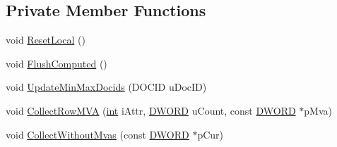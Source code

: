 \subsection*{Private Member Functions}
\begin{DoxyCompactItemize}
\item 
void \hyperlink{classAttrIndexBuilder__t_a227f1dbb6d0fb1033b981ae5cb452170}{Reset\-Local} ()
\item 
void \hyperlink{classAttrIndexBuilder__t_a1761813026908faf29c0d141918ea6cb}{Flush\-Computed} ()
\item 
void \hyperlink{classAttrIndexBuilder__t_aa98c07634ad244029e944ab717c566df}{Update\-Min\-Max\-Docids} (D\-O\-C\-I\-D u\-Doc\-I\-D)
\item 
void \hyperlink{classAttrIndexBuilder__t_afae151c0433d61cff90a90c4bcfbb07f}{Collect\-Row\-M\-V\-A} (\hyperlink{sphinxexpr_8cpp_a4a26e8f9cb8b736e0c4cbf4d16de985e}{int} i\-Attr, \hyperlink{sphinxstd_8h_a798af1e30bc65f319c1a246cecf59e39}{D\-W\-O\-R\-D} u\-Count, const \hyperlink{sphinxstd_8h_a798af1e30bc65f319c1a246cecf59e39}{D\-W\-O\-R\-D} $\ast$p\-Mva)
\item 
void \hyperlink{classAttrIndexBuilder__t_a708a8ff3615b7613bbcc0e2067a5c6ab}{Collect\-Without\-Mvas} (const \hyperlink{sphinxstd_8h_a798af1e30bc65f319c1a246cecf59e39}{D\-W\-O\-R\-D} $\ast$p\-Cur)
\end{DoxyCompactItemize}
